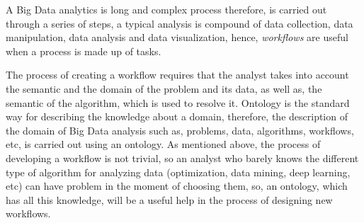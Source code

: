 



A Big Data analytics is long and complex process therefore, is carried out through a series of steps, a typical analysis is compound of data collection, data manipulation, data analysis and data visualization, hence, \textit{workflows} are useful when a process is made up of tasks.


The process of creating a workflow requires that the analyst takes into account the semantic and the domain of the problem and its data, as well as, the semantic of the algorithm, which is used to resolve it. Ontology is the standard way for describing the knowledge about a domain, therefore, the description of the domain of Big Data analysis such as, problems, data, algorithms, workflows, etc, is carried out using an ontology.
As mentioned above, the process of developing a workflow is not trivial, so an analyst who barely knows the different type of algorithm for analyzing data (optimization, data mining, deep learning, etc) can have problem in the moment of choosing them, so, an ontology, which has all this knowledge, will be a useful help in the process of designing new workflows.

